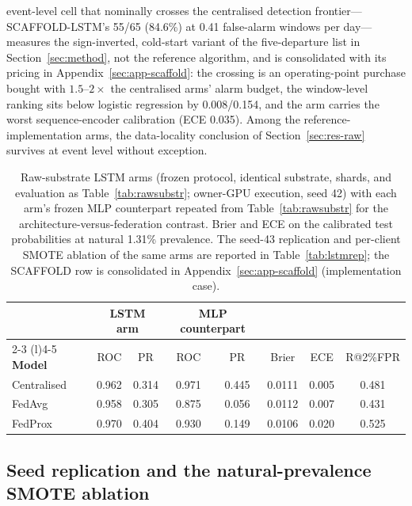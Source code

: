 event-level cell that nominally crosses the centralised detection
frontier---SCAFFOLD-LSTM's 55/65 (84.6\%) at 0.41 false-alarm
windows per day---measures the sign-inverted, cold-start variant of
the five-departure list in Section~\ref{sec:method}, not the
reference algorithm, and is consolidated with its pricing in
Appendix~\ref{sec:app-scaffold}: the crossing is an
operating-point purchase bought with $1.5$--$2\times$ the
centralised arms' alarm budget, the window-level ranking sits
below logistic regression by 0.008/0.154, and the arm carries the
worst sequence-encoder calibration (ECE 0.035). Among the
reference-implementation arms, the data-locality conclusion of
Section~\ref{sec:res-raw} survives at event level without
exception.

\begin{table}[t]
\centering
\caption{Raw-substrate LSTM arms (frozen protocol, identical
substrate, shards, and evaluation as Table~\ref{tab:rawsubstr};
owner-GPU execution, seed 42) with each arm's frozen MLP counterpart
repeated from Table~\ref{tab:rawsubstr} for the
architecture-versus-federation contrast. Brier and ECE on the
calibrated test probabilities at natural 1.31\% prevalence. The
seed-43 replication and per-client SMOTE ablation of the same arms
are reported in Table~\ref{tab:lstmrep}; the SCAFFOLD row is
consolidated in Appendix~\ref{sec:app-scaffold} (implementation
case).}
\label{tab:lstmraw}
\small
\begin{tabular}{@{}l cc cc c c c@{}}
\toprule
 & \multicolumn{2}{c}{\textbf{LSTM arm}} &
 \multicolumn{2}{c}{\textbf{MLP counterpart}} & & & \\
\cmidrule(r){2-3} \cmidrule(l){4-5}
\textbf{Model} & ROC & PR & ROC & PR & Brier & ECE & R@2\%FPR \\
\midrule
Centralised & 0.962 & 0.314 & 0.971 & 0.445 & 0.0111 & 0.005 & 0.481 \\
FedAvg & 0.958 & 0.305 & 0.875 & 0.056 & 0.0112 & 0.007 & 0.431 \\
FedProx & 0.970 & 0.404 & 0.930 & 0.149 & 0.0106 & 0.020 & 0.525 \\
\bottomrule
\end{tabular}
\end{table}

\subsection{Seed replication and the natural-prevalence SMOTE
ablation}
\label{sec:res-lstmrep}

